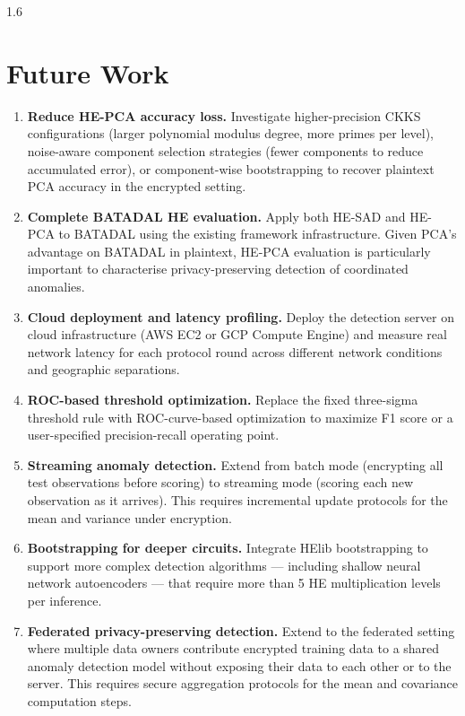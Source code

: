\begin{spacing}{1.6}
\section{Future Work}

\begin{enumerate}
  \item \textbf{Reduce HE-PCA accuracy loss.}
  Investigate higher-precision CKKS configurations (larger polynomial modulus
  degree, more primes per level), noise-aware component selection strategies
  (fewer components to reduce accumulated error), or component-wise bootstrapping
  to recover plaintext PCA accuracy in the encrypted setting.

  \item \textbf{Complete BATADAL HE evaluation.}
  Apply both HE-SAD and HE-PCA to BATADAL using the existing framework
  infrastructure. Given PCA's advantage on BATADAL in plaintext, HE-PCA
  evaluation is particularly important to characterise privacy-preserving
  detection of coordinated anomalies.

  \item \textbf{Cloud deployment and latency profiling.}
  Deploy the detection server on cloud infrastructure (AWS EC2 or GCP Compute
  Engine) and measure real network latency for each protocol round across
  different network conditions and geographic separations.

  \item \textbf{ROC-based threshold optimization.}
  Replace the fixed three-sigma threshold rule with ROC-curve-based optimization
  to maximize F1 score or a user-specified precision-recall operating point.

  \item \textbf{Streaming anomaly detection.}
  Extend from batch mode (encrypting all test observations before scoring)
  to streaming mode (scoring each new observation as it arrives). This requires
  incremental update protocols for the mean and variance under encryption.

  \item \textbf{Bootstrapping for deeper circuits.}
  Integrate HElib bootstrapping to support more complex detection algorithms
  --- including shallow neural network autoencoders --- that require more than
  5 HE multiplication levels per inference.

  \item \textbf{Federated privacy-preserving detection.}
  Extend to the federated setting where multiple data owners contribute
  encrypted training data to a shared anomaly detection model without exposing
  their data to each other or to the server. This requires secure aggregation
  protocols for the mean and covariance computation steps.


\end{enumerate}
\end{spacing}
